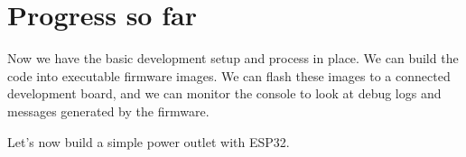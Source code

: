 \documentclass[main.tex]{subfiles}
\begin{document}
\section{Progress so far}
Now we have the basic development setup and process in place. We can build the code into executable firmware images. We can flash these images to a connected development board, and we can monitor the console to look at debug logs and messages generated by the firmware. 

Let's now build a simple power outlet with ESP32.
\end{document}
